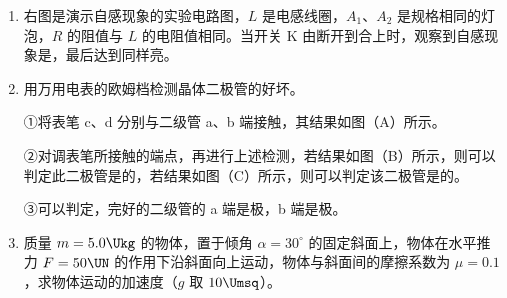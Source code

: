 \documentclass[\gkver]{gaokaozhenti}
\begin{document}
\begin{enumerate}

\item
右图是演示自感现象的实验电路图，$L$ 是电感线圈，$A_{1}$、$A_{2}$ 是规格相同的灯泡，$R$ 的阻值与 $L$ 的电阻值相同。当开关 K 由断开到合上时，观察到自感现象是，最后达到同样亮。
\onepicture[align=right, w=3.73cm]{}


\item
用万用电表的欧姆档检测晶体二极管的好坏。

①将表笔 c、d 分别与二级管 a、b 端接触，其结果如图（A）所示。

②对调表笔所接触的端点，再进行上述检测，若结果如图（B）所示，则可以判定此二极管是的，若结果如图（C）所示，则可以判定该二极管是的。

③可以判定，完好的二级管的 a 端是极，b 端是极。
\onepicture[align=right, h=7.13cm]{}


\item
质量 $m=5.0\Ukg$ 的物体，置于倾角 $\alpha=30^{\circ}$ 的固定斜面上，物体在水平推力 $F=50\UN$ 的作用下沿斜面向上运动，物体与斜面间的摩擦系数为 $\mu=0.1$，求物体运动的加速度（$g$ 取 $10\Umsq$）。
\onepicture[align=right, w=4.78cm]{}

\end{enumerate}
\end{document}

